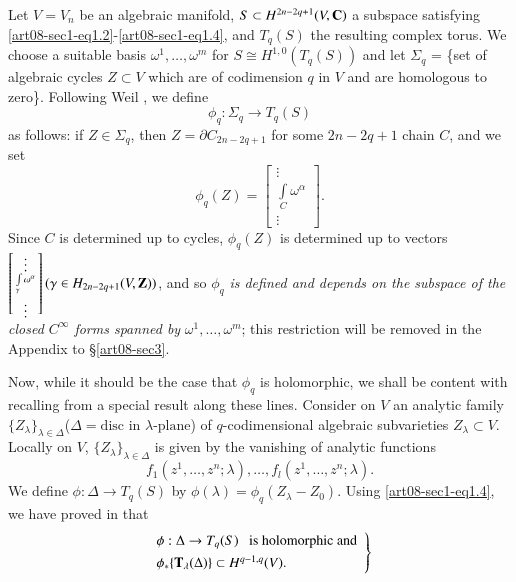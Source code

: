 Let $V=V_{n}$ be an algebraic manifold, $S\subset H^{2n-2q+1}(V,\mathbf{C})$ a subspace satisfying \eqref{art08-sec1-eq1.2}-\eqref{art08-sec1-eq1.4}, and $T_{q}(S)$ the resulting complex torus. We choose a suitable basis $\omega^{1},\ldots,\omega^{m}$ for $S\cong H^{1,0}(T_{q}(S))$ and let $\Sigma_{q}$ = \{set of algebraic cycles $Z\subset V$ which are of codimension $q$ in $V$ and are homologous to zero\}. Following Weil \cite{art08-key22}, we define
\setcounter{equation}{0}
\begin{equation}
\phi_{q}:\Sigma_{q}\to T_{q}(S)\label{art08-sec3-eq3.1}
\end{equation}
as follows: if $Z\in \Sigma_{q}$, then $Z=\partial C_{2n-2q+1}$ for some $2n-2q+1$ chain $C$, and we set 
\begin{equation}
\phi_{q}(Z)=
\begin{bmatrix}
\vdots\\
\int\limits_{C}\omega^{\alpha}\\
\vdots
\end{bmatrix}.\label{art08-sec3-eq3.2}
\end{equation}\pageoriginale
Since $C$ is determined up to cycles, $\phi_{q}(Z)$ is determined up to vectors $\left[\begin{smallmatrix}\vdots\\ \int\limits_{\gamma}\omega^{\alpha}\\ \vdots\end{smallmatrix}\right](\gamma\in H_{2n-2q+1}(V,\mathbf{Z}))$, and so $\phi_{q}$ {\em is defined and depends on the subspace of the closed $C^{\infty}$ forms spanned by} $\omega^{1},\ldots,\omega^{m}$; this restriction will be removed in the Appendix to \S\ref{art08-sec3}.

Now, while it should be the case that $\phi_{q}$ is holomorphic, we shall be content with recalling from \cite{art08-key9} a special result along these lines. Consider on $V$ an analytic family $\{Z_{\lambda}\}_{\lambda\in \Delta}$($\Delta=\text{disc in~}\lambda\text{-plane}$) of $q$-codimensional algebraic subvarieties $Z_{\lambda}\subset V$. Locally on $V$, $\{Z_{\lambda}\}_{\lambda\in \Delta}$ is given by the vanishing of analytic functions 
$$
f_{1}(z^{1},\ldots,z^{n};\lambda),\ldots,f_{l}(z^{1},\ldots,z^{n};\lambda).
$$ 
We define $\phi:\Delta\to T_{q}(S)$ by $\phi(\lambda)=\phi_{q}(Z_{\lambda}-Z_{0})$. Using  \eqref{art08-sec1-eq1.4}, we have proved in \cite{art08-key9} that
\begin{equation}
\left.
\begin{array}{l}
\phi :\Delta\to T_{q}(S)\text{~~ is holomorphic and}\\[4pt]
\phi_{*}\{\mathbf{T}_{\lambda}(\Delta)\}\subset H^{q-1,q}(V).
\end{array}\right\}\label{art08-sec3-eq3.3}
\end{equation}

